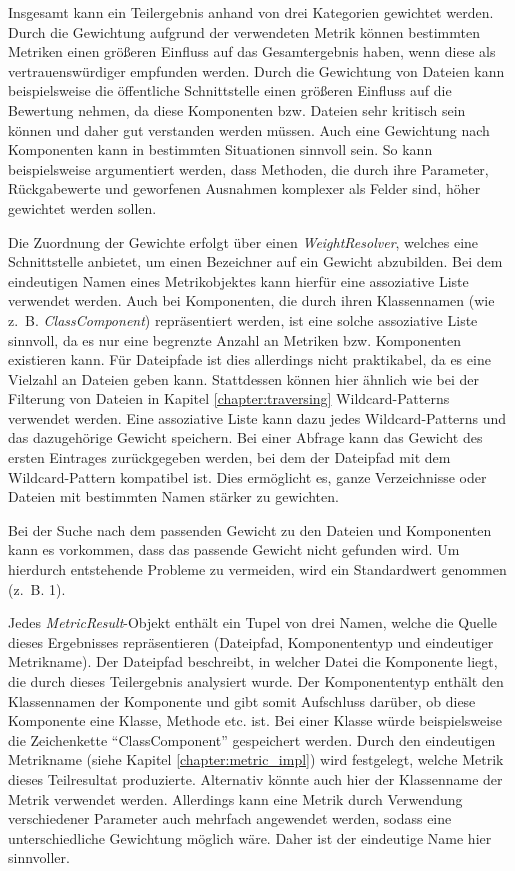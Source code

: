 Insgesamt kann ein Teilergebnis anhand von drei Kategorien gewichtet werden. Durch die Gewichtung aufgrund der verwendeten Metrik können bestimmten Metriken einen größeren Einfluss auf das Gesamtergebnis haben, wenn diese als vertrauenswürdiger empfunden werden. Durch die Gewichtung von Dateien kann beispielsweise die öffentliche Schnittstelle einen größeren Einfluss auf die Bewertung nehmen, da diese Komponenten bzw. Dateien sehr kritisch sein können und daher gut verstanden werden müssen. Auch eine Gewichtung nach Komponenten kann in bestimmten Situationen sinnvoll sein. So kann beispielsweise argumentiert werden, dass Methoden, die durch ihre Parameter, Rückgabewerte und geworfenen Ausnahmen komplexer als Felder sind, höher gewichtet werden sollen.

Die Zuordnung der Gewichte erfolgt über einen \textit{WeightResolver}, welches eine Schnittstelle anbietet, um einen Bezeichner auf ein Gewicht abzubilden. Bei dem eindeutigen Namen eines Metrikobjektes kann hierfür eine assoziative Liste verwendet werden. Auch bei Komponenten, die durch ihren Klassennamen (wie z.~B. \textit{ClassComponent}) repräsentiert werden, ist  eine solche assoziative Liste sinnvoll, da es nur eine begrenzte Anzahl an Metriken bzw. Komponenten existieren kann.
Für Dateipfade ist dies allerdings nicht praktikabel, da es eine Vielzahl an Dateien geben kann. Stattdessen können hier ähnlich wie bei der Filterung von Dateien in Kapitel \ref{chapter:traversing} Wildcard-Patterns verwendet werden. Eine assoziative Liste kann dazu jedes Wildcard-Patterns und das dazugehörige Gewicht speichern. Bei einer Abfrage kann das Gewicht des ersten Eintrages zurückgegeben werden, bei dem der Dateipfad mit dem Wildcard-Pattern kompatibel ist. Dies ermöglicht es, ganze Verzeichnisse oder Dateien mit bestimmten Namen stärker zu gewichten. 

Bei der Suche nach dem passenden Gewicht zu den Dateien und Komponenten kann es vorkommen, dass das passende Gewicht nicht gefunden wird. Um hierdurch entstehende Probleme zu vermeiden, wird ein Standardwert genommen (z.~B. 1). 

Jedes \textit{MetricResult}-Objekt enthält ein Tupel von drei Namen, welche die Quelle dieses Ergebnisses repräsentieren (Dateipfad, Komponententyp und eindeutiger Metrikname). Der Dateipfad beschreibt, in welcher Datei die Komponente liegt, die durch dieses Teilergebnis analysiert wurde. Der Komponententyp enthält den Klassennamen der Komponente und gibt somit Aufschluss darüber, ob diese Komponente eine Klasse, Methode etc. ist. Bei einer Klasse würde beispielsweise die Zeichenkette \enquote{ClassComponent} gespeichert werden. Durch den eindeutigen Metrikname (siehe Kapitel \ref{chapter:metric_impl}) wird  festgelegt, welche Metrik dieses Teilresultat produzierte. Alternativ könnte auch hier der Klassenname der Metrik verwendet werden. Allerdings kann eine Metrik durch Verwendung verschiedener Parameter auch mehrfach angewendet werden, sodass eine unterschiedliche Gewichtung möglich wäre. Daher ist der eindeutige Name hier sinnvoller.

